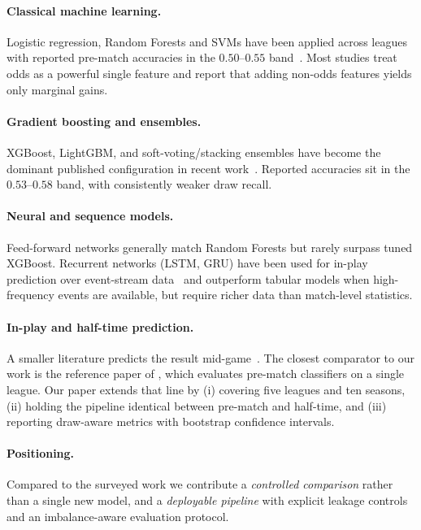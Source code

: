 \documentclass[pdflatex,sn-mathphys-num]{sn-jnl}
\theoremstyle{thmstyleone}
\theoremstyle{thmstyletwo}
\theoremstyle{thmstylethree}
\begin{document}
\paragraph{Classical machine learning.} Logistic regression, Random
Forests and SVMs have been applied across leagues with reported
pre-match accuracies in the $0.50$--$0.55$ band~\cite{bib2,bib5,bib6}.
Most studies treat odds as a powerful single feature and report
that adding non-odds features yields only marginal gains.

\paragraph{Gradient boosting and ensembles.} XGBoost, LightGBM, and
soft-voting/stacking ensembles have become the dominant published
configuration in recent work~\cite{bib7,bib8}. Reported accuracies sit
in the $0.53$--$0.58$ band, with consistently weaker draw recall.

\paragraph{Neural and sequence models.} Feed-forward networks generally
match Random Forests but rarely surpass tuned XGBoost. Recurrent
networks (LSTM, GRU) have been used for in-play prediction over
event-stream data~\cite{bib9} and outperform tabular models when
high-frequency events are available, but require richer data than
match-level statistics.

\paragraph{In-play and half-time prediction.} A smaller literature
predicts the result mid-game~\cite{bib10}. The closest comparator to our
work is the reference paper of \cite{bib11}, which evaluates pre-match
classifiers on a single league. Our paper extends that line by (i)
covering five leagues and ten seasons, (ii) holding the pipeline
identical between pre-match and half-time, and (iii) reporting
draw-aware metrics with bootstrap confidence intervals.

\paragraph{Positioning.} Compared to the surveyed work we contribute a
\emph{controlled comparison} rather than a single new model, and a
\emph{deployable pipeline} with explicit leakage controls and an
imbalance-aware evaluation protocol.
\end{document}
